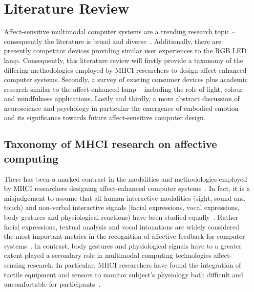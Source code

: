 \documentclass{sigchi}
\begin{document}
\section{Literature Review}

Affect-sensitive multimodal computer systems are a trending research topic – consequently the literature is broad and diverse~\cite{marechal2019survey, pantic2003toward, pantic2008human}. Additionally, there are presently competitor devices providing similar user experiences to the RGB LED lamp. Consequently, this literature review will firstly provide a taxonomy of the differing methodologies employed by MHCI researchers to design affect-enhanced computer systems. Secondly, a survey of existing consumer devices plus academic research similar to the affect-enhanced lamp – including the role of light, colour and mindfulness applications. Lastly and thirdly, a more abstract discussion of neuroscience and psychology in particular the emergence of embodied emotion and its significance towards future affect-sensitive computer design. 

\subsection{Taxonomy of MHCI research on affective computing}

There has been a marked contrast in the modalities and methodologies employed by MHCI researchers designing affect-enhanced computer systems~\cite{pantic2008human}. In fact, it is a misjudgement to assume that all human interactive modalities (sight, sound and touch) and non-verbal interactive signals (facial expressions, vocal expressions, body gestures and physiological reactions) have been studied equally~\cite{pantic2003toward}. Rather facial expressions, textual analysis and vocal intonations are widely considered the most important metrics in the recognition of affective feedback for computer systems~\cite{marechal2019survey, pantic2008human}. In contrast, body gestures and physiological signals have to a greater extent played a secondary role in multimodal computing technologies affect-sensing research. In particular, MHCI researchers have found the integration of tactile equipment and sensors to monitor subject’s physiology both difficult and uncomfortable for participants~\cite{pantic2008human, 5771346}.
\end{document}
